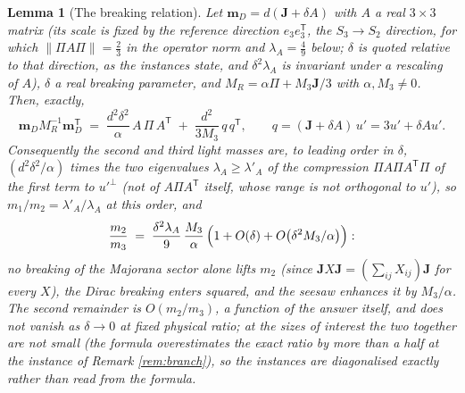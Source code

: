 \documentclass[11pt]{article}
\newtheorem{lemma}[theorem]{Lemma}
\theoremstyle{definition}
\newcommand{\J}{\mathbf{J}}
\newcommand{\mD}{\mathbf{m}_{D}}
\begin{document}
\begin{lemma}[The breaking relation]\label{lem:breaking}
Let $\mD = d(\J + \delta A)$ with $A$ a real $3 \times 3$ matrix (its scale is fixed by the reference direction $e_{3}e_{3}^{\mathsf{T}}$, the $S_{3} \to S_{2}$ direction, for which $\|\Pi A\Pi\| = \tfrac23$ in the operator norm and $\lambda_{A} = \tfrac49$ below; $\delta$ is quoted relative to that direction, as the instances state, and $\delta^{2}\lambda_{A}$ is invariant under a rescaling of $A$), $\delta$ a real breaking parameter, and $M_{R} = \alpha\Pi + M_{3}\J/3$ with $\alpha, M_{3} \neq 0$. Then, exactly,
\[
\mD M_{R}^{-1}\mD^{\mathsf{T}} \;=\; \frac{d^{2}\delta^{2}}{\alpha}\,A\,\Pi\,A^{\mathsf{T}} \;+\; \frac{d^{2}}{3M_{3}}\,q\,q^{\mathsf{T}}, \qquad q = (\J + \delta A)\,u' = 3u' + \delta A u' .
\]
Consequently the second and third light masses are, to leading order in $\delta$, $(d^{2}\delta^{2}/\alpha)$ times the two eigenvalues $\lambda_{A} \ge \lambda'_{A}$ of the compression $\Pi A\Pi A^{\mathsf{T}}\Pi$ of the first term to $u'^{\perp}$ (not of $A\Pi A^{\mathsf{T}}$ itself, whose range is not orthogonal to $u'$), so $m_{1}/m_{2} = \lambda'_{A}/\lambda_{A}$ at this order, and
\[
\frac{m_{2}}{m_{3}} \;=\; \frac{\delta^{2}\lambda_{A}}{9}\,\frac{M_{3}}{\alpha}\,\Bigl(1 + O(\delta) + O\bigl(\delta^{2}M_{3}/\alpha\bigr)\Bigr):
\]
no breaking of the Majorana sector alone lifts $m_{2}$ (since $\J X \J = (\textstyle\sum_{ij}X_{ij})\J$ for every $X$), the Dirac breaking enters squared, and the seesaw enhances it by $M_{3}/\alpha$. The second remainder is $O(m_{2}/m_{3})$, a function of the answer itself, and does not vanish as $\delta \to 0$ at fixed physical ratio; at the sizes of interest the two together are not small (the formula overestimates the exact ratio by more than a half at the instance of Remark \ref{rem:branch}), so the instances are diagonalised exactly rather than read from the formula.
\end{lemma}
\end{document}
